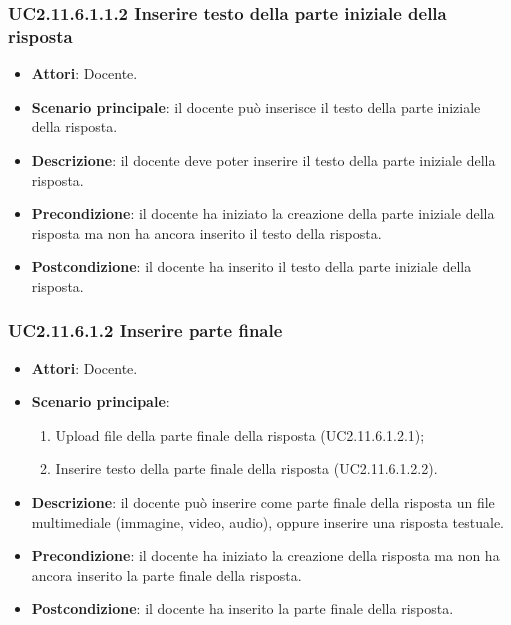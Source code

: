 \subsubsection{UC2.11.6.1.1.2 Inserire testo della parte iniziale della risposta}
\begin{itemize}
\item \textbf{Attori}: Docente.
\item \textbf{Scenario principale}: il docente può inserisce il testo della parte iniziale della risposta.
\item \textbf{Descrizione}: il docente deve poter inserire il testo della parte iniziale della risposta.
\item \textbf{Precondizione}: il docente ha iniziato la creazione della parte iniziale della risposta ma non ha ancora inserito il testo della risposta.
\item \textbf{Postcondizione}: il docente ha inserito il testo della parte iniziale della risposta.
\end{itemize}
\subsubsection{UC2.11.6.1.2 Inserire parte finale}
\begin{itemize}
\item \textbf{Attori}: Docente.
\item \textbf{Scenario principale}:
\begin{enumerate}
\item Upload file della parte finale della risposta (UC2.11.6.1.2.1);
\item Inserire testo della parte finale della risposta (UC2.11.6.1.2.2).
\end{enumerate}
\item \textbf{Descrizione}: il docente può inserire come parte finale della risposta un file multimediale (immagine, video, audio), oppure inserire una risposta testuale.
\item \textbf{Precondizione}: il docente ha iniziato la creazione della risposta ma non ha ancora inserito la parte finale della risposta.
\item \textbf{Postcondizione}: il docente ha inserito la parte finale della risposta.
\end{itemize}
